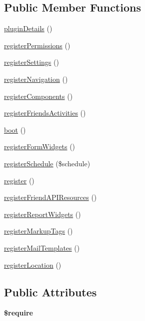 \subsection*{Public Member Functions}
\begin{DoxyCompactItemize}
\item 
\hyperlink{classDMA_1_1Friends_1_1Plugin_abcae4983c18bdb7b266c6aaa7a081d68}{plugin\+Details} ()
\item 
\hyperlink{classDMA_1_1Friends_1_1Plugin_a1f5f007ec6f0f3f16516cf1a2e19d296}{register\+Permissions} ()
\item 
\hyperlink{classDMA_1_1Friends_1_1Plugin_ad494274bdd3480e4623b5fec196352b3}{register\+Settings} ()
\item 
\hyperlink{classDMA_1_1Friends_1_1Plugin_aaca6d71040b99d2151b2760c93f3e61c}{register\+Navigation} ()
\item 
\hyperlink{classDMA_1_1Friends_1_1Plugin_aba0ea6e404e36aaba19174560d3781ac}{register\+Components} ()
\item 
\hyperlink{classDMA_1_1Friends_1_1Plugin_aee1fcfd6978df90e396e75223e24080a}{register\+Friends\+Activities} ()
\item 
\hyperlink{classDMA_1_1Friends_1_1Plugin_a8ff526c557ed7081a1f4c04194994305}{boot} ()
\item 
\hyperlink{classDMA_1_1Friends_1_1Plugin_a900bf22951ffe9e109d1c14afdd261d5}{register\+Form\+Widgets} ()
\item 
\hyperlink{classDMA_1_1Friends_1_1Plugin_a325d26dd168b48639619da76610957f0}{register\+Schedule} (\$schedule)
\item 
\hyperlink{classDMA_1_1Friends_1_1Plugin_adfd39323d7e2724cdacdb41d590b32e2}{register} ()
\item 
\hyperlink{classDMA_1_1Friends_1_1Plugin_a7fd72bd73f0dbe5e7200a0b1fa3e2bcf}{register\+Friend\+A\+P\+I\+Resources} ()
\item 
\hyperlink{classDMA_1_1Friends_1_1Plugin_af4c0877dc0c5067f527fa414bc70de57}{register\+Report\+Widgets} ()
\item 
\hyperlink{classDMA_1_1Friends_1_1Plugin_acc1be499ecb2966c300f002f94b9e261}{register\+Markup\+Tags} ()
\item 
\hyperlink{classDMA_1_1Friends_1_1Plugin_aaab460ba502e3b45284785c291e39bf9}{register\+Mail\+Templates} ()
\item 
\hyperlink{classDMA_1_1Friends_1_1Plugin_a4db89cce1a087a7635d5f6b1134854df}{register\+Location} ()
\end{DoxyCompactItemize}
\subsection*{Public Attributes}
\begin{DoxyCompactItemize}
\item 
{\bfseries \$require}
\end{DoxyCompactItemize}


